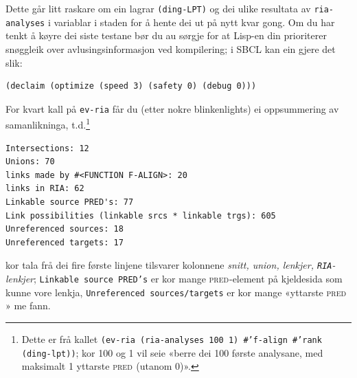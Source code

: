 \documentclass[12pt,a4paper,oneside,draft]{report}
\newcommand{\F}[2]{\textsc{#1}\ensuremath{_{#2}}}
\newcommand{\PRED}{\F{pred}{}}
\begin{document}
Dette går litt raskare om ein lagrar \texttt{(ding-LPT)} og dei ulike
 resultata av \texttt{ria-analyses} i variablar i staden for å hente dei ut
 på nytt kvar gong. Om du har tenkt å køyre dei siste testane bør du
 au sørgje for at Lisp-en din prioriterer snøggleik over
 avlusingsinformasjon ved kompilering; i SBCL kan ein gjere det slik:


\begin{verbatim}
(declaim (optimize (speed 3) (safety 0) (debug 0)))
\end{verbatim}



For kvart kall på \texttt{ev-ria} får du (etter nokre blinkenlights) ei
 oppsummering av samanlikninga, t.d.\footnote{Dette er frå kallet \texttt{(ev-ria (ria-analyses         100 1) \#'f-align \#'rank (ding-lpt))}; kor 100 og 1 vil seie
        «berre dei 100 første analysane, med maksimalt 1 yttarste
        \PRED{} (utanom 0)». }


\begin{verbatim}
Intersections: 12
Unions: 70
links made by #<FUNCTION F-ALIGN>: 20
links in RIA: 62
Linkable source PRED's: 77
Link possibilities (linkable srcs * linkable trgs): 605
Unreferenced sources: 18
Unreferenced targets: 17
\end{verbatim}



kor tala frå dei fire første linjene tilsvarer kolonnene \emph{snitt,
 union, lenkjer, \texttt{RIA}-lenkjer}; \texttt{Linkable source PRED's} er
 kor mange \PRED{}-element på kjeldesida som kunne vore lenkja,
 \texttt{Unreferenced sources/targets} er kor mange «yttarste \PRED{}» me
 fann.
\end{document}
